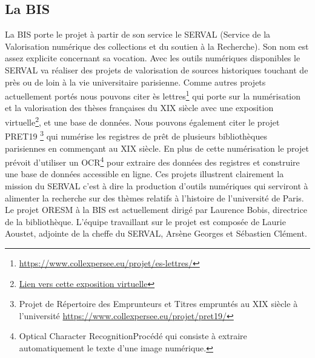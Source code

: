 \subsection{La BIS}
La BIS porte le projet à partir de son service le SERVAL (Service de la Valorisation numérique des collections et du soutien à la Recherche). Son nom est assez explicite concernant sa vocation. Avec les outils numériques disponibles le SERVAL va réaliser des projets de valorisation de sources historiques touchant de près ou de loin à la vie universitaire parisienne. Comme autres projets actuellement portés nous pouvons citer \og ès lettres\fg\footnote{\href{https://www.collexpersee.eu/projet/es-lettres/}{https://www.collexpersee.eu/projet/es-lettres/}} qui porte sur la numérisation et la valorisation des thèses françaises du \textsc{XIX}\ieme{} siècle avec une exposition virtuelle\footnote{\href{https://nubis.univ-paris1.fr/s/theses-doctorats-es-lettres-19-siecle-exposition-devenir-savant/page/introduction}{Lien vers cette exposition virtuelle}}, et une base de données. Nous pouvons également citer le projet PRET19 \footnote{Projet de Répertoire des Emprunteurs et Titres empruntés au \textsc{XIX}\ieme{} siècle à l’université \href{https://www.collexpersee.eu/projet/pret19/}{https://www.collexpersee.eu/projet/pret19/}} qui numérise les registres de prêt de plusieurs bibliothèques parisiennes en commençant au \textsc{XIX}\ieme{} siècle. En plus de cette numérisation le projet prévoit d'utiliser un OCR\footnote{\og Optical Character Recognition\fg  Procédé qui consiste à extraire automatiquement le texte d'une image numérique.} pour extraire des données des registres et construire une base de données accessible en ligne. Ces projets illustrent clairement la mission du SERVAL c'est à dire la production d'outils numériques qui serviront à alimenter la recherche sur des thèmes relatifs à l'histoire de l'université de Paris. Le projet ORESM à la BIS est actuellement dirigé par Laurence Bobis, directrice de la bibliothèque. L'équipe travaillant sur le projet est composée de Laurie Aoustet, adjointe de la cheffe du SERVAL, Arsène Georges et Sébastien Clément.
